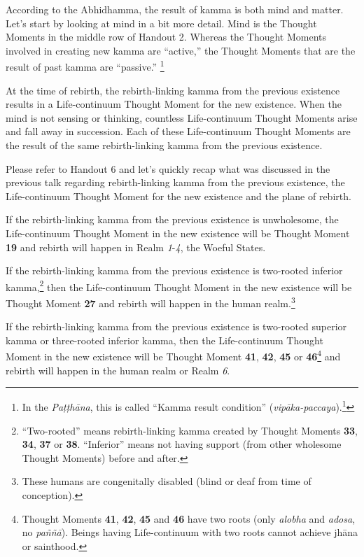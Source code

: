According to the Abhidhamma, the result of kamma is both mind and matter. Let’s start by looking at mind in a bit more detail. Mind is the Thought Moments in the middle row of Handout 2. Whereas the Thought Moments involved in creating new kamma are “active,” the Thought Moments that are the result of past kamma are “passive.” \footnote{In the \textit{Paṭṭhāna}, this is called “Kamma result condition” (\textit{vipāka-paccaya}).\footnote{More details in Chapter 12 of “The Conditionality of Life” (see Footnote 2).}}

At the time of rebirth, the rebirth-linking kamma from the previous existence results in a Life-continuum Thought Moment for the new existence. When the mind is not sensing or thinking, countless Life-continuum Thought Moments arise and fall away in succession. Each of these Life-continuum Thought Moments are the result of the same rebirth-linking kamma from the previous existence.

Please refer to Handout 6 and let’s quickly recap what was discussed in the previous talk regarding rebirth-linking kamma from the previous existence, the Life-continuum Thought Moment for the new existence and the plane of rebirth.

If the rebirth-linking kamma from the previous existence is unwholesome, the Life-continuum Thought Moment in the new existence will be Thought Moment \textbf{19} and rebirth will happen in Realm \textit{1}-\textit{4}, the Woeful States. 

If the rebirth-linking kamma from the previous existence is two-rooted inferior kamma,\footnote{“Two-rooted” means rebirth-linking kamma created by Thought Moments \textbf{33}, \textbf{34}, \textbf{37} or \textbf{38}. “Inferior” means not having support (from other wholesome Thought Moments) before and after.} then the Life-continuum Thought Moment in the new existence will be Thought Moment \textbf{27} and rebirth will happen in the human realm.\footnote{These humans are congenitally disabled (blind or deaf from time of conception).}

If the rebirth-linking kamma from the previous existence is two-rooted superior kamma or three-rooted inferior kamma, then the Life-continuum Thought Moment in the new existence will be Thought Moment \textbf{41}, \textbf{42}, \textbf{45} or \textbf{46}\footnote{Thought Moments \textbf{41}, \textbf{42}, \textbf{45} and \textbf{46} have two roots (only \textit{alobha} and \textit{adosa}, no \textit{paññā}). Beings having Life-continuum with two roots cannot achieve jhāna or sainthood.} and rebirth will happen in the human realm or Realm \textit{6}. 

